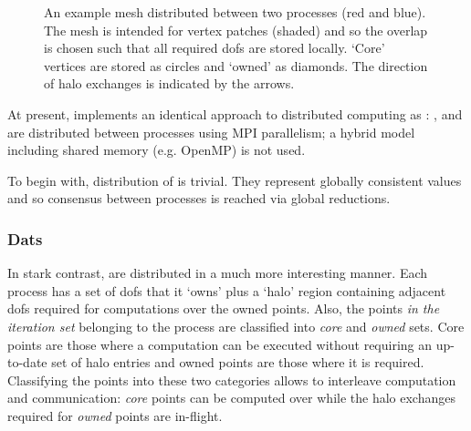 \begin{figure}
  \caption{
    An example mesh distributed between two processes (red and blue).
    The mesh is intended for vertex patches (shaded) and so the overlap is chosen such that all required \glspl{dof} are stored locally.
    `Core' vertices are stored as circles and `owned' as diamonds.
    The direction of halo exchanges is indicated by the arrows.
  }
  \label{fig:halos}
\end{figure}

At present,  implements an identical approach to distributed computing as : ,  and  are distributed between processes using MPI parallelism; a hybrid model including shared memory (e.g. OpenMP) is not used.

To begin with, distribution of  is trivial.
They represent globally consistent values and so consensus between processes is reached via global reductions.

\subsubsection{Dats}

In stark contrast,  are distributed in a much more interesting manner.
Each process has a set of \glspl{dof} that it `owns' plus a `halo' region containing adjacent \glspl{dof} required for computations over the owned points.
Also, the points \textit{in the iteration set} belonging to the process are classified into \textit{core} and \textit{owned} sets.
Core points are those where a computation can be executed without requiring an up-to-date set of halo entries and owned points are those where it is required.
Classifying the points into these two categories allows  to interleave computation and communication: \textit{core} points can be computed over while the halo exchanges required for \textit{owned} points are in-flight.

